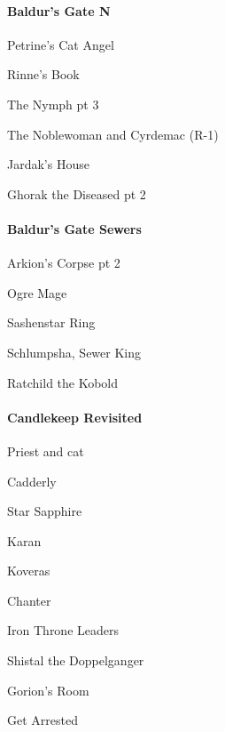 \documentclass[10pt,a4,twoside]{book}
\begin{document}
\begin{multicols}{3}
\paragraph*{Baldur's Gate N}
\begin{trivlist}
\item Petrine's Cat Angel
\item Rinne's Book
\item The Nymph pt 3
\item The Noblewoman and Cyrdemac {\textcolor{Mahogany}{(R-1)}}   \label{noblewoman} %
\item Jardak's House
\item Ghorak the Diseased pt 2 \label{skull} %
\end{trivlist}

\paragraph*{Baldur's Gate Sewers}
\begin{trivlist}
\item Arkion's Corpse pt 2
\item Ogre Mage
\item Sashenstar Ring
\item Schlumpsha, Sewer King
\item Ratchild the Kobold
\end{trivlist}

\paragraph*{Candlekeep Revisited}%
\begin{trivlist}
\item Priest and cat
\item Cadderly
\item Star Sapphire %


\item Karan
\item Koveras
\item Chanter
\item Iron Throne Leaders
\item Shistal the Doppelganger
\item Gorion's Room
\item Get Arrested
\end{trivlist}


\end{multicols}
\end{document}
